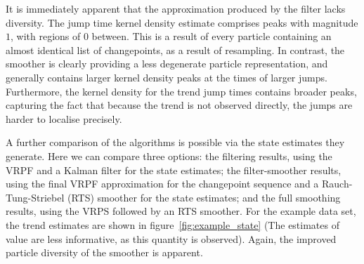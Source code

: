 \documentclass[journal]{IEEEtran}
\begin{document}
It is immediately apparent that the approximation produced by the filter lacks diversity. The jump time kernel density estimate comprises peaks with magnitude $1$, with regions of $0$ between. This is a result of every particle containing an almost identical list of changepoints, as a result of resampling. In contrast, the smoother is clearly providing a less degenerate particle representation, and generally contains larger kernel density peaks at the times of larger jumps. Furthermore, the kernel density for the trend jump times contains broader peaks, capturing the fact that because the trend is not observed directly, the jumps are harder to localise precisely.

A further comparison of the algorithms is possible via the state estimates they generate. Here we can compare three options: the filtering results, using the VRPF and a Kalman filter for the state estimates; the filter-smoother results, using the final VRPF approximation for the changepoint sequence and a Rauch-Tung-Striebel (RTS) smoother for the state estimates; and the full smoothing results, using the VRPS followed by an RTS smoother. For the example data set, the trend estimates are shown in figure~\ref{fig:example_state} (The estimates of value are less informative, as this quantity is observed). Again, the improved particle diversity of the smoother is apparent.
\end{document}
